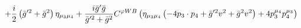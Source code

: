 %
\begin{dmath*}
%
  +  \frac{i}{2}\left({\bar g}^{\prime 2} + {\bar g}{}^2\right) \eta_{\mu_3 \mu_4}  +  \frac{i {\bar g}^\prime {\bar g}{}}{{\bar g}^{\prime 2} + {\bar g}{}^2}C^{ \varphi  WB} \left(\eta_{\mu_3 \mu_4} \left( - 4 p_{3}\nobreak\cdot\nobreak{}p_{4} + {\bar g}^{\prime 2} v^2 + {\bar g}{}^2 v^2\right) + 4 p_3^{\mu_4} p_4^{\mu_3}\right)
%
\end{dmath*}
%
